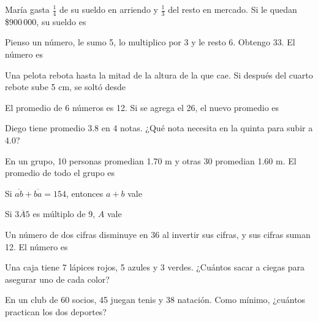 \evaluacion
\begin{ejercicios}
\item María gasta $\tfrac{1}{4}$ de su sueldo en arriendo y $\tfrac{1}{3}$ del resto en mercado. Si le quedan \$900\,000, su sueldo es
\item Pienso un número, le sumo 5, lo multiplico por 3 y le resto 6. Obtengo 33. El número es
\item Una pelota rebota hasta la mitad de la altura de la que cae. Si después del cuarto rebote sube 5 cm, se soltó desde
\opciones{40 cm}{80 cm}{100 cm}{160 cm}
\item El promedio de 6 números es 12. Si se agrega el 26, el nuevo promedio es
\item Diego tiene promedio 3.8 en 4 notas. ¿Qué nota necesita en la quinta para subir a 4.0?
\item En un grupo, 10 personas promedian 1.70 m y otras 30 promedian 1.60 m. El promedio de todo el grupo es
\item Si $\overline{ab} + \overline{ba} = 154$, entonces $a + b$ vale
\item Si $\overline{3A5}$ es múltiplo de 9, $A$ vale
\item Un número de dos cifras disminuye en 36 al invertir sus cifras, y sus cifras suman 12. El número es
\item Una caja tiene 7 lápices rojos, 5 azules y 3 verdes. ¿Cuántos sacar a ciegas para asegurar uno de cada color?
\item En un club de 60 socios, 45 juegan tenis y 38 natación. Como mínimo, ¿cuántos practican los dos deportes?
\end{ejercicios}
